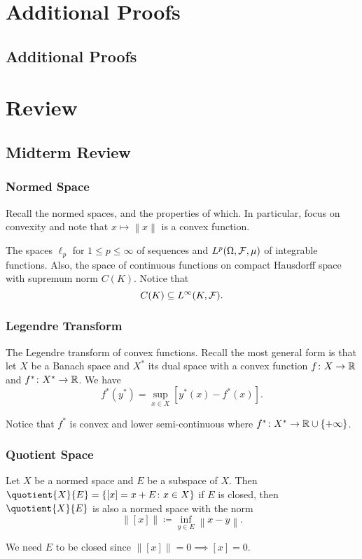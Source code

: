 \chapter{Additional Proofs}
\section{Additional Proofs}\label{Apx:Additional-Proofs}
\chapter{Review}
\section{Midterm Review}
\subsection{Normed Space}
Recall the normed spaces, and the properties of which. In particular, focus on convexity and note that \(x\mapsto \left\lVert x\right\rVert \) is a convex function.

\begin{eg}
	The spaces \(\ell _p\) for \(1 \leq p \leq \infty \) of sequences and \(L^p(\Omega , \mathcal{\MakeUppercase{f}} , \mu )\) of integrable functions. Also, the space of continuous functions on compact Hausdorff space with supremum norm \(C(K)\). Notice that
	\[
		C(K) \subseteq L^{\infty} (K, \mathcal{\MakeUppercase{f}}).
	\]
\end{eg}

\subsection{Legendre Transform}
The Legendre transform of convex functions. Recall the most general form is that let \(X\) be a Banach space and \(X^{\ast} \) its dual space with a convex function \(f\colon X\to \mathbb{\MakeUppercase{r}} \) and \(f^{\ast} \colon X^{\ast} \to \mathbb{\MakeUppercase{r}} \). We have
\[
	f^{\ast} (y^{\ast} ) = \sup _{x\in X}\left[ y^{\ast} (x) - f^{\ast} (x) \right].
\]

Notice that \(f^{\ast} \) is convex and lower semi-continuous where \(f^{\ast} \colon X^{\ast} \to \mathbb{\MakeUppercase{r}} \cup \left\{ +\infty  \right\} \).

\subsection{Quotient Space}
Let \(X\) be a normed space and \(E\) be a subspace of \(X\). Then \(\quotient{X}{E} = \left\{ [x] = x+E\colon x\in X \right\}  \) if \(E\) is closed, then \(\quotient{X}{E} \) is also a normed space with the norm
\[
	\left\lVert [x]\right\rVert \coloneqq \inf _{y\in E}\left\lVert x- y\right\rVert.
\]
\begin{remark}
	We need \(E\) to be closed since \(\left\lVert [x]\right\rVert = 0 \implies [x] = 0\).
\end{remark}

